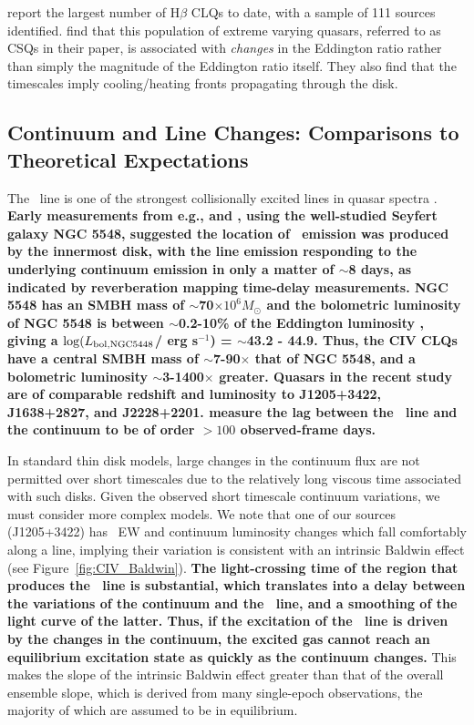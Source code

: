 \documentclass[fleqn,usenatbib]{mnras}
\begin{document}
\citet{Graham2020} report the largest number of H$\beta$ CLQs to
date, with a sample of 111 sources identified. \citet{Graham2020}
find that this population of extreme varying quasars, referred to as
CSQs in their paper, is associated with {\it changes} in the Eddington
ratio rather than simply the magnitude of the Eddington ratio itself.
They also find that the timescales imply cooling/heating fronts
propagating through the disk.


\subsection{Continuum and Line Changes: Comparisons to Theoretical Expectations}\label{sec:theory}
The \civ\ line is one of the strongest collisionally excited lines in
quasar spectra \citep[e.g.,][]{HamannFerland1999}.
{\bf Early measurements from e.g., \citet{PoggePeterson1992} and
\citet{Peterson1997book}, using the well-studied Seyfert galaxy NGC
5548, suggested the location of \civ\ emission was produced by the
innermost disk, with the line emission responding to the underlying
continuum emission in only a matter of $\sim$8 days, as indicated by
reverberation mapping time-delay measurements. NGC 5548 has an SMBH
mass of $\sim$70$\times 10^{6} M_{\odot}$ \citep[][]{Horne2020} and
the bolometric luminosity of NGC 5548 is between $\sim$0.2-10\% of the
Eddington luminosity \citep{Ebrero2016, Fausnaugh2016}, giving a
$\log(L_{\rm bol, NGC5448}$/ erg s$^{-1}$) = $\sim$43.2 - 44.9.
Thus, the CIV CLQs have a central SMBH mass of $\sim$7-90$\times$ that
of NGC 5548, and a bolometric luminosity $\sim$3-1400$\times$
greater. Quasars in the recent \citet{Grier2019} study are of
comparable redshift and luminosity to J1205+3422, J1638+2827, and
J2228+2201. \citet{Grier2019} measure the lag between the \civ\ line
and the continuum to be of order $>100$ observed-frame days.}

In standard \citet{SS73} thin disk models, large changes in the
continuum flux are not permitted over short timescales due to the
relatively long viscous time associated with such disks. Given the
observed short timescale continuum variations, we must consider more
complex models. We note that one of our sources (J1205+3422) has \civ\
EW and continuum luminosity changes which fall comfortably along a
line, implying their variation is consistent with an intrinsic Baldwin
effect (see Figure~\ref{fig:CIV_Baldwin}).
{\bf The light-crossing time of the region that produces the \civ\
line is substantial, which translates into a delay between the
variations of the continuum and the \civ\ line, and a smoothing of the
light curve of the latter.  Thus, if the excitation of the \civ\ line
is driven by the changes in the continuum, the excited gas cannot
reach an equilibrium excitation state as quickly as the continuum
changes.}
This makes the slope of the intrinsic Baldwin effect greater than that
of the overall ensemble slope, which is derived from many single-epoch
observations, the majority of which are assumed to be in equilibrium.
\end{document}
